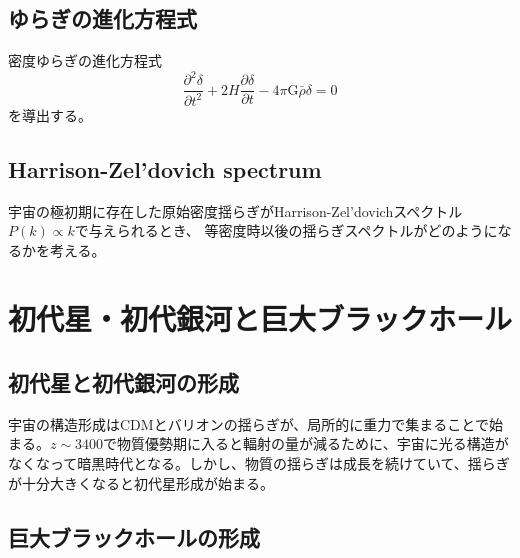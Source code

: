 \documentclass[a4paper,papersize,uplatex,dvipdfmx,10pt]{jsarticle}
\begin{document}
\subsection{ゆらぎの進化方程式}
密度ゆらぎの進化方程式
\begin{equation}
  \frac{\partial^{2} \delta}{\partial t^{2}}+2H\frac{\partial \delta}{\partial t}-4\pi\mathrm{G}\bar{\rho}\delta=0
\end{equation}
を導出する。

\subsection{Harrison-Zel'dovich spectrum}
宇宙の極初期に存在した原始密度揺らぎがHarrison-Zel’dovichスペクトル$P(k) \propto k$で与えられるとき、 等密度時以後の揺らぎスペクトルがどのようになるかを考える。

\section{初代星・初代銀河と巨大ブラックホール}
\subsection{初代星と初代銀河の形成}
宇宙の構造形成はCDMとバリオンの揺らぎが、局所的に重力で集まることで始まる。$z\sim3400$で物質優勢期に入ると輻射の量が減るために、宇宙に光る構造がなくなって暗黒時代となる。しかし、物質の揺らぎは成長を続けていて、揺らぎが十分大きくなると初代星形成が始まる。


\subsection{巨大ブラックホールの形成}


\renewcommand{\bibname}{参考文献}


\end{document}
